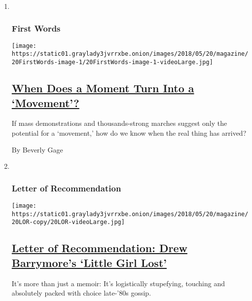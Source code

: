 \begin{enumerate}
\def\labelenumi{\arabic{enumi}.}
\item ~
  \hypertarget{first-words}{%
  \subsubsection{First Words}\label{first-words}}

  \texttt{[image: https://static01.graylady3jvrrxbe.onion/images/2018/05/20/magazine/20FirstWords-image-1/20FirstWords-image-1-videoLarge.jpg]}

  \hypertarget{when-does-a-moment-turn-into-a-movement}{%
  \subsection{\texorpdfstring{\href{/2018/05/15/magazine/when-does-a-moment-turn-into-a-movement.html}{When
  Does a Moment Turn Into a
  `Movement'?}}{When Does a Moment Turn Into a `Movement'?}}\label{when-does-a-moment-turn-into-a-movement}}

  If mass demonstrations and thousands-strong marches suggest only the
  potential for a `movement,' how do we know when the real thing has
  arrived?

  By Beverly Gage
\item ~
  \hypertarget{letter-of-recommendation}{%
  \subsubsection{Letter of
  Recommendation}\label{letter-of-recommendation}}

  \texttt{[image: https://static01.graylady3jvrrxbe.onion/images/2018/05/20/magazine/20LOR-copy/20LOR-videoLarge.jpg]}

  \hypertarget{letter-of-recommendation-drew-barrymores-little-girl-lost}{%
  \subsection{\texorpdfstring{\href{/2018/05/15/magazine/letter-of-recommendation-drew-barrymores-little-girl-lost.html}{Letter
  of Recommendation: Drew Barrymore's `Little Girl
  Lost'}}{Letter of Recommendation: Drew Barrymore's `Little Girl Lost'}}\label{letter-of-recommendation-drew-barrymores-little-girl-lost}}

  It's more than just a memoir: It's logistically stupefying, touching
  and absolutely packed with choice late-'80s gossip.


\end{enumerate}
